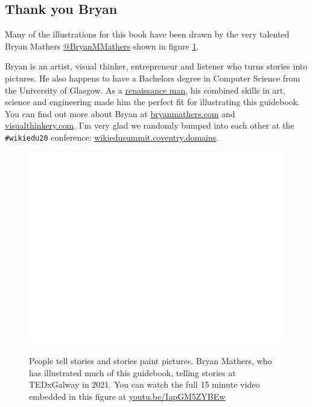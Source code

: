 \documentclass[
]{book}
\begin{document}
\hypertarget{visualthinkery}{%
\subsection{Thank you Bryan}\label{visualthinkery}}

Many of the illustrations for this book have been drawn by the very talented Bryan Mathers \href{https://twitter.com/BryanMMathers/}{@BryanMMathers} shown in figure \ref{fig:tedx-galway-fig}.

Bryan is an artist, visual thinker, entrepreneur and listener who turns stories into pictures. He also happens to have a Bachelors degree in Computer Science from the University of Glasgow. As a \href{https://en.wikipedia.org/wiki/Renaissance_man}{renaissance man}, his combined skills in art, science and engineering made him the perfect fit for illustrating this guidebook. You can find out more about Bryan at \href{https://bryanmmathers.com}{bryanmathers.com} and \href{https://visualthinkery.com}{visualthinkery.com}. I'm very glad we randomly bumped into each other at the \texttt{\#wikiedu20} conference: \href{https://wikiedusummit.coventry.domains/}{wikiedusummit.coventry.domains}.

\begin{figure}

{\centering \href{https://www.youtube.com/embed/IapGM5ZYBEw}{\includegraphics[width=1\linewidth]{cdyf_files/figure-latex/tedx-galway-fig-1} }

}

\caption{People tell stories and stories paint pictures. Bryan Mathers, who has illustrated much of this guidebook, telling stories at TEDxGalway in 2021. You can watch the full 15 minute video embedded in this figure at \href{https://youtu.be/IapGM5ZYBEw}{youtu.be/IapGM5ZYBEw} \citep{tedxgalway}}\label{fig:tedx-galway-fig}
\end{figure}
\end{document}

